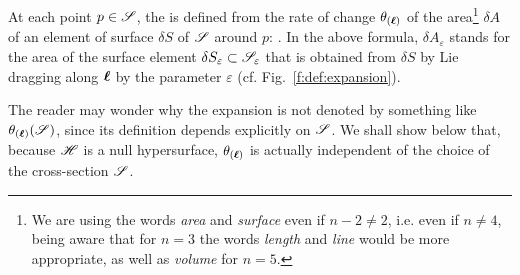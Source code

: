 At each point $p\in\mathscr{S}$, the  is defined from the
rate of change $\theta_{(\bm{\ell})}$ of the area\footnote{We are using the words
\emph{area} and \emph{surface} even if $n-2 \not= 2$, i.e. even if $n\not = 4$,
being aware that for $n=3$ the words \emph{length} and \emph{line} would
be more appropriate, as well as \emph{volume} for $n=5$.}
 $\delta A$ of an element of surface $\delta S$ of
$\mathscr{S}$ around $p$:
\be \label{e:def:def_expansion}
    .
\ee
In the above formula, $\delta A_\varepsilon$ stands for the area of the
surface element $\delta S_\varepsilon\subset \mathscr{S}_\varepsilon$ that is obtained from $\delta S$ by
Lie dragging along $\bm{\ell}$ by the parameter $\varepsilon$ (cf. Fig.~\ref{f:def:expansion}).
\begin{remark} \label{r:def:expansion_indpt_S}
The reader may wonder why the expansion is not denoted by something like
$\theta_{(\bm{\ell})}(\mathscr{S})$, since its definition depends explicitly on
$\mathscr{S}$. We shall show below that, because $\mathscr{H}$ is a null hypersurface, $\theta_{(\bm{\ell})}$
is actually independent of the choice of the cross-section $\mathscr{S}$.
\end{remark}

